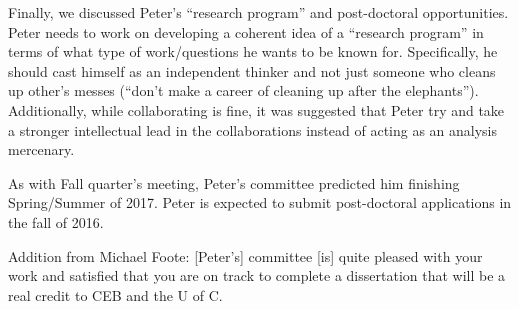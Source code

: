 \documentclass{article}
\begin{document}
Finally, we discussed Peter's ``research program'' and post-doctoral opportunities. Peter needs to work on developing a coherent idea of a ``research program'' in terms of what type of work/questions he wants to be known for. Specifically, he should cast himself as an independent thinker and not just someone who cleans up other's messes (``don't make a career of cleaning up after the elephants''). Additionally, while collaborating is fine, it was suggested that Peter try and take a stronger intellectual lead in the collaborations instead of acting as an analysis mercenary.

As with Fall quarter's meeting, Peter's committee predicted him finishing Spring/Summer of 2017. Peter is expected to submit post-doctoral applications in the fall of 2016.


Addition from Michael Foote: [Peter's] committee [is] quite pleased with your work and satisfied that you are on track to complete a dissertation that will be a real credit to CEB and the U of C. 
\end{document}
